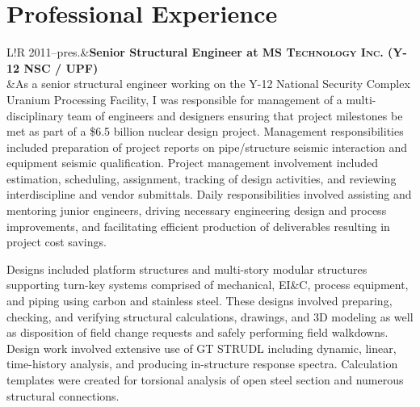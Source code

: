 \documentclass[11pt,letterpaper]{article}
\newcommand\VRule{\color{lightgray}\vrule width 0.5pt}
\begin{document}
\section*{Professional Experience}
\begin{tabular}{L!{\VRule}R}
2011--pres.&{\bf Senior Structural Engineer at \fontsize{12}{12}\textsc{MS Technology Inc. (Y-12 NSC / UPF)}}\\
&As a senior structural engineer working on the Y-12 National Security Complex Uranium Processing Facility, I was responsible for management of a multi-disciplinary team of engineers and designers ensuring that project milestones be met as part of a \$6.5 billion nuclear design project.  Management responsibilities included preparation of project reports on pipe/structure seismic interaction and equipment seismic qualification.  Project management involvement included estimation, scheduling, assignment, tracking of design activities, and reviewing interdiscipline and vendor submittals.  Daily responsibilities involved assisting and mentoring junior engineers, driving necessary engineering design and process improvements, and facilitating efficient production of deliverables resulting in project cost savings.  
\vspace{0.6em}
\par
Designs included platform structures and multi-story modular structures supporting turn-key systems comprised of mechanical, EI\&C, process equipment, and piping using carbon and stainless steel.  These designs involved preparing, checking, and verifying structural calculations, drawings, and 3D modeling as well as disposition of field change requests and safely performing field walkdowns. Design work involved extensive use of GT STRUDL including dynamic, linear, time-history analysis, and producing in-structure response spectra.  Calculation templates were created for torsional analysis of open steel section and numerous structural connections.
\end{tabular}
\end{document}
